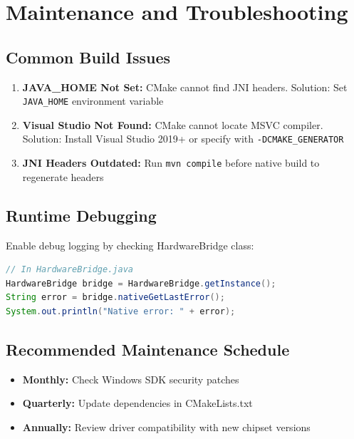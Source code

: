 \documentclass[12pt,a4paper]{article}
\begin{document}
\newpage

\section{Maintenance and Troubleshooting}

\subsection{Common Build Issues}

\begin{enumerate}
    \item \textbf{JAVA\_HOME Not Set:} CMake cannot find JNI headers. Solution: Set \texttt{JAVA\_HOME} environment variable
    \item \textbf{Visual Studio Not Found:} CMake cannot locate MSVC compiler. Solution: Install Visual Studio 2019+ or specify with \texttt{-DCMAKE\_GENERATOR}
    \item \textbf{JNI Headers Outdated:} Run \texttt{mvn compile} before native build to regenerate headers
\end{enumerate}

\subsection{Runtime Debugging}

Enable debug logging by checking HardwareBridge class:

\begin{lstlisting}[language=Java, caption=Enable Native Debugging]
// In HardwareBridge.java
HardwareBridge bridge = HardwareBridge.getInstance();
String error = bridge.nativeGetLastError();
System.out.println("Native error: " + error);
\end{lstlisting}

\subsection{Recommended Maintenance Schedule}

\begin{itemize}
    \item \textbf{Monthly:} Check Windows SDK security patches
    \item \textbf{Quarterly:} Update dependencies in CMakeLists.txt
    \item \textbf{Annually:} Review driver compatibility with new chipset versions
\end{itemize}
\end{document}
